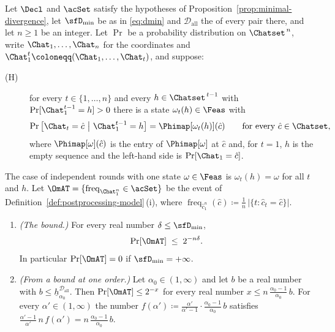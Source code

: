 \begin{proposition}\label{prop:model-pass-bound}
Let $\Decl$ and $\acSet$ satisfy the hypotheses of
Proposition~\ref{prop:minimal-divergence}, let $\sfD_{\min}$ be as in
\eqref{eq:dmin} and $\mathcal{D}_{\mathrm{all}}$ the  of every
pair there, and let $n\ge1$ be an integer. Let $\Pr$ be a probability
distribution on $\Chatset^{\,n}$, write $\Chat_1,\dots,\Chat_n$ for the
coordinates and $\Chat_1^{t}\coloneqq(\Chat_1,\dots,\Chat_t)$, and suppose:
\begin{description}
\item[(H)] for every $t\in\{1,\dots,n\}$ and every $h\in\Chatset^{\,t-1}$
  with $\Pr[\Chat_1^{t-1}=h]>0$ there is a state $\omega_t(h)\in\Feas$ with
  \begin{equation}\label{eq:pass-hypothesis}
    \Pr\big[\Chat_t=\hat c\ \big|\ \Chat_1^{t-1}=h\big]
    =\Phimap[\omega_t(h)](\hat c)\qquad\text{for every }\hat c\in\Chatset ,
  \end{equation}
  where $\Phimap[\omega](\hat c)$ is the entry of $\Phimap[\omega]$ at
  $\hat c$ and, for $t=1$, $h$ is the empty sequence and the left-hand side
  is $\Pr[\Chat_1=\hat c]$.
\end{description}
The case of independent rounds with one state $\omega\in\Feas$ is
$\omega_t(h)=\omega$ for all $t$ and $h$. Let
$\OmAT=\{\operatorname{freq}_{\Chat_1^n}\in\acSet\}$ be the event of
Definition~\ref{def:postprocessing-model}\,(i), where
$\operatorname{freq}_{\hat c_1^n}(\hat c)\coloneqq
\frac1n\,|\{t:\hat c_t=\hat c\}|$.
\begin{enumerate}[label=(\roman*),leftmargin=2.2em]
\item \emph{(The bound.)} For every real number $\delta\le\sfD_{\min}$,
  \begin{equation}\label{eq:pass-bound}
    \Pr[\OmAT]\;\le\;2^{-n\delta} .
  \end{equation}
  In particular $\Pr[\OmAT]=0$ if $\sfD_{\min}=+\infty$.
\item \emph{(From a bound at one order.)} Let $\alpha_0\in(1,\infty)$ and let
  $b$ be a real number with
  $b\le\underline{h}^{\mathcal{D}_{\mathrm{all}}}_{\alpha_0}$. Then
  $\Pr[\OmAT]\le2^{-x}$ for every real number
  $x\le n\,\frac{\alpha_0-1}{\alpha_0}\,b$. For every
  $\alpha'\in(1,\infty)$ the number
  $f(\alpha')\coloneqq\frac{\alpha'}{\alpha'-1}\cdot\frac{\alpha_0-1}{\alpha_0}\,b$
  satisfies $\frac{\alpha'-1}{\alpha'}\,n\,f(\alpha')
  =n\,\frac{\alpha_0-1}{\alpha_0}\,b$.
\end{enumerate}
\end{proposition}

